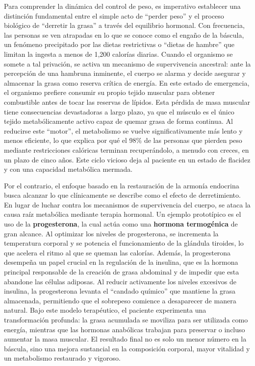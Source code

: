 \documentclass[
  spanish,
]{article}
\begin{document}
Para comprender la dinámica del control de peso, es imperativo establecer una distinción fundamental entre el simple acto de ``perder peso'' y el proceso biológico de ``derretir la grasa'' a través del equilibrio hormonal. Con frecuencia, las personas se ven atrapadas en lo que se conoce como el engaño de la báscula, un fenómeno precipitado por las dietas restrictivas o ``dietas de hambre'' que limitan la ingesta a menos de 1,200 calorías diarias. Cuando el organismo se somete a tal privación, se activa un mecanismo de supervivencia ancestral: ante la percepción de una hambruna inminente, el cuerpo se alarma y decide asegurar y almacenar la grasa como reserva crítica de energía. En este estado de emergencia, el organismo prefiere consumir su propio tejido muscular para obtener combustible antes de tocar las reservas de lípidos.
Esta pérdida de masa muscular tiene consecuencias devastadoras a largo plazo, ya que el músculo es el único tejido metabólicamente activo capaz de quemar grasa de forma continua. Al reducirse este ``motor'', el metabolismo se vuelve significativamente más lento y menos eficiente, lo que explica por qué el 98\% de las personas que pierden peso mediante restricciones calóricas terminan recuperándolo, a menudo con creces, en un plazo de cinco años. Este ciclo vicioso deja al paciente en un estado de flacidez y con una capacidad metabólica mermada.

Por el contrario, el enfoque basado en la restauración de la armonía endocrina busca alcanzar lo que clínicamente se describe como el efecto de derretimiento. En lugar de luchar contra los mecanismos de supervivencia del cuerpo, se ataca la causa raíz metabólica mediante terapia hormonal. Un ejemplo prototípico es el uso de la \textbf{progesterona}, la cual actúa como una \textbf{hormona termogénica} de gran alcance. Al optimizar los niveles de progesterona, se incrementa la temperatura corporal y se potencia el funcionamiento de la glándula tiroides, lo que acelera el ritmo al que se queman las calorías.
Además, la progesterona desempeña un papel crucial en la regulación de la insulina, que es la hormona principal responsable de la creación de grasa abdominal y de impedir que esta abandone las células adiposas. Al reducir activamente los niveles excesivos de insulina, la progesterona levanta el ``candado químico'' que mantiene la grasa almacenada, permitiendo que el sobrepeso comience a desaparecer de manera natural. Bajo este modelo terapéutico, el paciente experimenta una transformación profunda: la grasa acumulada se moviliza para ser utilizada como energía, mientras que las hormonas anabólicas trabajan para preservar o incluso aumentar la masa muscular. El resultado final no es solo un menor número en la báscula, sino una mejora sustancial en la composición corporal, mayor vitalidad y un metabolismo restaurado y vigoroso.
\end{document}
